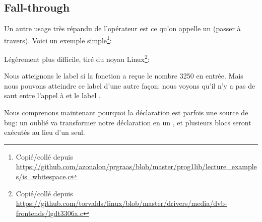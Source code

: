 ﻿\subsection{Fall-through}

Un autre usage très répandu de l'opérateur  est ce qu'on appelle
un  (passer à travers).
Voici un exemple simple\footnote{Copié/collé depuis \url{https://github.com/azonalon/prgraas/blob/master/prog1lib/lecture_examples/is_whitespace.c}}:



Légèrement plus difficile, tiré du noyau Linux\footnote{Copié/collé depuis \url{https://github.com/torvalds/linux/blob/master/drivers/media/dvb-frontends/lgdt3306a.c}}:





Nous atteignons le label  si la fonction a reçue le nombre 3250 en entrée.
Mais nous pouvons atteindre ce label d'une autre façon:
nous voyons qu'il n'y a pas de saut entre l'appel à \printf et le label .

Nous comprenons maintenant pourquoi la déclaration  est parfois une
source de bug:
un  oublié va transformer notre déclaration  en un ,
et plusieurs blocs seront exécutés au lieu d'un seul.

